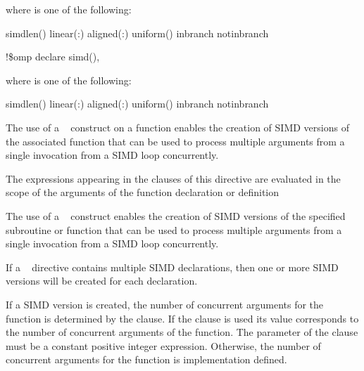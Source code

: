 where  is one of the following:

\begin{indentedcodelist}
simdlen()
linear(\plc{argument-list[ }:\plc{ constant-linear-step]})
aligned(\plc{argument-list[ }:\plc{ alignment]})
uniform()
inbranch
notinbranch
\end{indentedcodelist}
\ccppspecificend


\fortranspecificstart
\begin{boxedcode}
!\$omp declare simd()\plc{ [clause[ [},\plc{] clause] ... ]}
\end{boxedcode}

where  is one of the following:
\begin{indentedcodelist}
simdlen()
linear(\plc{argument-list[ }:\plc{ constant-linear-step]})
aligned(\plc{argument-list[ }:\plc{ alignment]})
uniform()
inbranch
notinbranch
\end{indentedcodelist}
\fortranspecificend


\descr
\ccppspecificstart
The use of a ~ construct on a function enables the creation of SIMD 
versions of the associated function that can be used to process multiple arguments from 
a single invocation from a SIMD loop concurrently.

The expressions appearing in the clauses of this directive are evaluated in the scope of 
the arguments of the function declaration or definition
\ccppspecificend

\begin{samepage}
\fortranspecificstart
The use of a ~ construct enables the creation of SIMD versions of the 
specified subroutine or function that can be used to process multiple arguments from a 
single invocation from a SIMD loop concurrently. 
\fortranspecificend
\end{samepage}

If a ~ directive contains multiple SIMD declarations, then one or more 
SIMD versions will be created for each declaration.

If a SIMD version is created, the number of concurrent arguments for the function is 
determined by the  clause. If the  clause is used its value 
corresponds to the number of concurrent arguments of the function. The parameter of 
the  clause must be a constant positive integer expression. Otherwise, the 
number of concurrent arguments for the function is implementation defined.

